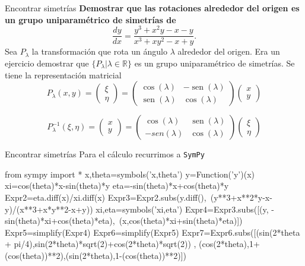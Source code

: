 \documentclass[handout,hyperref={colorlinks=true}]{beamer}
\newcommand{\rr}{\mathbb{R}}
\DeclareMathOperator{\sen}{sen}
\begin{document}
\begin{frame}{Encontrar simetrías}
\textbf{Demostrar que las rotaciones alrededor del origen es un grupo uniparamétrico de simetrías de}
 \[\frac{dy}{dx}=\frac{y^3+x^2y-x-y}{x^3+xy^2-x+y}.\]
Sea $P_{\lambda}$ la transformación que rota un ángulo $\lambda$ alrededor del origen. Era un ejercicio demostrar que  $\{P_{\lambda}|\lambda\in\rr\}$ es un grupo uniparamétrico de simetrías. Se tiene la representación matricial
\[
P_{\lambda}(x,y)= \begin{pmatrix} \xi\\ \eta
\end{pmatrix}=\begin{pmatrix} \cos(\lambda) & -\sen(\lambda)
\\ \sen(\lambda) & \cos(\lambda)
\end{pmatrix} \begin{pmatrix} x\\ y
\end{pmatrix}
\]

\[
P^{-1}_{\lambda}(\xi,\eta)= \begin{pmatrix} x\\ y
\end{pmatrix}=\begin{pmatrix} \cos(\lambda) & \sen(\lambda)
\\ -sen(\lambda) & \cos(\lambda)
\end{pmatrix} \begin{pmatrix} \xi\\ \eta
\end{pmatrix}
\]



\end{frame}


\begin{frame}[fragile]{Encontrar simetrías}
 Para el cálculo recurrimos a \texttt{SymPy}
\begin{sageblock}
from sympy import *
x,theta=symbols('x,theta')
y=Function('y')(x)
xi=cos(theta)*x-sin(theta)*y
eta=-sin(theta)*x+cos(theta)*y
Expr2=eta.diff(x)/xi.diff(x)
Expr3=Expr2.subs(y.diff(),\
(y**3+x**2*y-x-y)/(x**3+x*y**2-x+y))
xi,eta=symbols('xi,eta')
Expr4=Expr3.subs([(y, -sin(theta)*xi+cos(theta)*eta),\
(x,cos(theta)*xi+sin(theta)*eta)])
Expr5=simplify(Expr4)
Expr6=simplify(Expr5)
Expr7=Expr6.subs([(sin(2*theta + pi/4),sin(2*theta)*sqrt(2)+cos(2*theta)*sqrt(2))  , (cos(2*theta),1+(cos(theta))**2),(sin(2*theta),1-(cos(theta))**2)])
\end{sageblock}
\end{frame}
\end{document}
